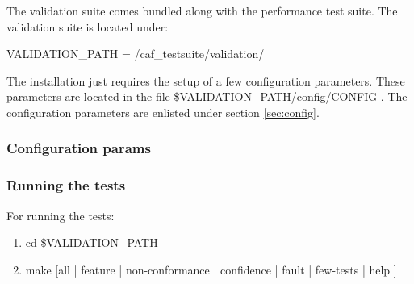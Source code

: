 The validation suite comes bundled along with the performance test suite. The validation suite is located under: 

VALIDATION\_PATH = /caf\_testsuite/validation/

The installation just requires the setup of a few configuration parameters. These parameters are located in the file \$VALIDATION\_PATH/config/CONFIG . The configuration parameters are enlisted under section \ref{sec:config}.


\subsubsection{Configuration params}



\subsubsection{Running the tests}
For running the tests:
\begin{enumerate}
\item cd \$VALIDATION\_PATH
\item make [all | feature | non-conformance | confidence | fault | few-tests | help ]
\end{enumerate}


